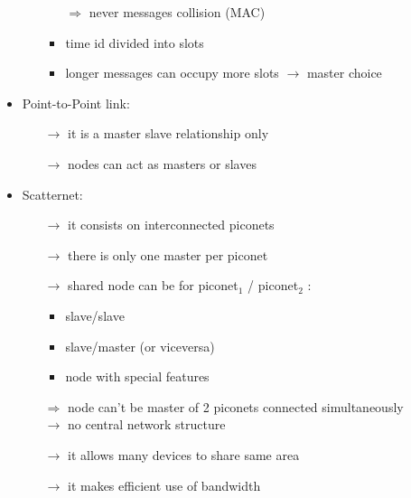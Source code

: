 \begin{itemize}
\begin{itemize}
\begin{itemize}
\begin{itemize}
            \end{itemize}
            $\Rightarrow$ never messages collision (MAC)
            \item time id divided into slots
            \item longer messages can occupy more slots $\rightarrow$ master choice
        \end{itemize}
    \end{itemize}
    \item Point-to-Point link:
    \begin{itemize}
        \item[$\rightarrow$] it is a master slave relationship only
        \item[$\rightarrow$] nodes can act as masters or slaves
    \end{itemize}
    \item Scatternet:
    \begin{itemize}
        \item[$\rightarrow$] it consists on interconnected piconets
        \item[$\rightarrow$] there is only one master per piconet
        \item[$\rightarrow$] shared node can be for piconet$_1$ / piconet$_2$ :
        \begin{itemize}
            \item slave/slave
            \item slave/master (or viceversa)
            \item node with special features
        \end{itemize}
        $\Rightarrow$ node can't be master of 2 piconets connected simultaneously\\
        $\rightarrow$ no central network structure
        \item[$\rightarrow$] it allows many devices to share same area
        \item[$\rightarrow$] it makes efficient use of bandwidth
    \end{itemize}
\end{itemize}
